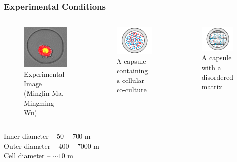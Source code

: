 \documentclass{beamer}
\begin{document}
  \begin{frame}
    \frametitle{Experimental Conditions}
  	\begin{columns}[t] 
  	\begin{figure}
  	  \includegraphics[width=1.0in]{minglin.png}
  	  \caption{Experimental Image (Minglin Ma, Mingming Wu)}
  	\end{figure}
    \begin{figure}
      \includegraphics[width=1.25in]{Fig1.png}
      \caption{A capsule containing a cellular co-culture}
    \end{figure}
    \begin{figure}
      \includegraphics[width=1.25in]{Fig2.png}
      \caption{A capsule with a disordered matrix}
    \end{figure}
    \end{columns}
    
    Inner diameter -- $50-700$ \textmu m\\
    Outer diameter -- $400-7000$ \textmu m\\
	Cell diameter -- $\sim 10$ \textmu m\\
    
    \vfill
    
  \end{frame}
  
\end{document}
